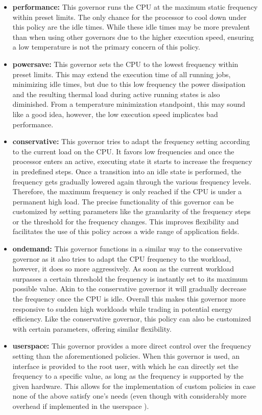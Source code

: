 \begin{itemize}
\item \textbf{performance:} This governor runs the CPU at the maximum static frequency within preset limits. The only chance for the processor to cool down under this policy are the idle times. While these idle times may be more prevalent than when using other governors due to the higher execution speed, ensuring a low temperature is not the primary concern of this policy.
\item \textbf{powersave:} This governor sets the CPU to the lowest frequency within preset limits. This may extend the execution time of all running jobs, minimizing idle times, but due to this low frequency the power dissipation and the resulting thermal load during active running states is also diminished. From a temperature minimization standpoint, this may sound like a good idea, however, the low execution speed implicates bad performance.
\item \textbf{conservative:} This governor tries to adapt the frequency setting according to the current load on the CPU. It favors low frequencies and once the processor enters an active, executing state it starts to increase the frequency in predefined steps. Once a transition into an idle state is performed, the frequency gets gradually lowered again through the various frequency levels. Therefore, the maximum frequency is only reached if the CPU is under a permanent high load. The precise functionality of this governor can be customized by setting parameters like the granularity of the frequency steps or the threshold for the frequency changes. This improves flexibility and facilitates the use of this policy across a wide range of application fields.
\item \textbf{ondemand:} This governor functions in a similar way to the conservative governor as it also tries to adapt the CPU frequency to the workload, however, it does so more aggressively. As soon as the current workload surpasses a certain threshold the frequency is instantly set to its maximum possible value. Akin to the conservative governor it will gradually decrease the frequency once the CPU is idle. Overall this makes this governor more responsive to sudden high workloads while trading in potential energy efficiency. Like the conservative governor, this policy can also be customized with certain parameters, offering similar flexibility.
\item \textbf{userspace:} This governor provides a more direct control over the frequency setting than the aforementioned policies. When this governor is used, an interface is provided to the root user, with which he can  directly set the frequency to a specific value, as long as the frequency is supported by the given hardware. This allows for the implementation of custom policies in case none of the above satisfy one's needs (even though with considerably more overhead if implemented in the userspace \cite{Pallipadi2006}). 
\end{itemize}
